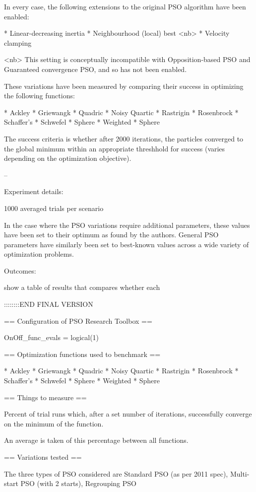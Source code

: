 In every case, the following extensions to the original PSO algorithm have been
enabled:

* Linear-decreasing inertia
* Neighbourhood (local) best <nb>
* Velocity clamping

<nb> This setting is conceptually incompatible with Opposition-based PSO and
Guaranteed convergence PSO, and so has not been enabled.

These variations have been measured by comparing their success in optimizing
the following functions:

* Ackley
* Griewangk
* Quadric
* Noisy Quartic
* Rastrigin
* Rosenbrock
* Schaffer’s
* Schwefel
* Sphere
* Weighted
* Sphere

The success criteria is whether after 2000 iterations, the particles converged
to the global minimum within an appropriate threshhold for success (varies
depending on the optimization objective).

--

Experiment details:

1000 averaged trials per scenario

In the case where the PSO variations require additional parameters, these
values have been set to their optimum as found by the authors. General PSO
parameters have similarly been set to best-known values across a wide variety
of optimization problems.

Outcomes:

show a table of results that compares whether each 







::::::::END FINAL VERSION


== Configuration of PSO Research Toolbox ==

    OnOff_func_evals = logical(1)

== Optimization functions used to benchmark ==

* Ackley
* Griewangk
* Quadric
* Noisy Quartic
* Rastrigin
* Rosenbrock
* Schaffer’s
* Schwefel
* Sphere
* Weighted
* Sphere

== Things to measure ==

Percent of trial runs which, after a set number of iterations, successfully
converge on the minimum of the function.

An average is taken of this percentage between all functions.

== Variations tested ==

The three types of PSO considered
are Standard PSO (as per 2011 spec), Multi-start PSO (with 2 starts),
Regrouping PSO

